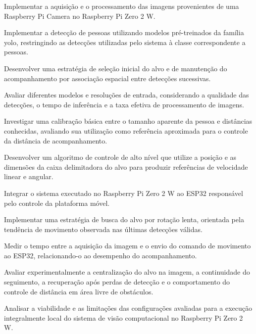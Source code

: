 \begin{alineas}
    \item Implementar a aquisição e o processamento das imagens provenientes de uma Raspberry Pi Camera no Raspberry Pi Zero 2 W.
    \item Implementar a detecção de pessoas utilizando modelos pré-treinados da família \gls{yolo}, restringindo as detecções utilizadas pelo sistema à classe correspondente a pessoas.
    \item Desenvolver uma estratégia de seleção inicial do alvo e de manutenção do acompanhamento por associação espacial entre detecções sucessivas.
    \item Avaliar diferentes modelos e resoluções de entrada, considerando a qualidade das detecções, o tempo de inferência e a taxa efetiva de processamento de imagens.
    \item Investigar uma calibração básica entre o tamanho aparente da pessoa e distâncias conhecidas, avaliando sua utilização como referência aproximada para o controle da distância de acompanhamento.
    \item Desenvolver um algoritmo de controle de alto nível que utilize a posição e as dimensões da caixa delimitadora do alvo para produzir referências de velocidade linear e angular.
    \item Integrar o sistema executado no Raspberry Pi Zero 2 W ao ESP32 responsável pelo controle da plataforma móvel.
    \item Implementar uma estratégia de busca do alvo por rotação lenta, orientada pela tendência de movimento observada nas últimas detecções válidas.
    \item Medir o tempo entre a aquisição da imagem e o envio do comando de movimento ao ESP32, relacionando-o ao desempenho do acompanhamento.
    \item Avaliar experimentalmente a centralização do alvo na imagem, a continuidade do seguimento, a recuperação após perdas de detecção e o comportamento do controle de distância em área livre de obstáculos.
    \item Analisar a viabilidade e as limitações das configurações avaliadas para a execução integralmente local do sistema de visão computacional no Raspberry Pi Zero 2 W.
\end{alineas}
